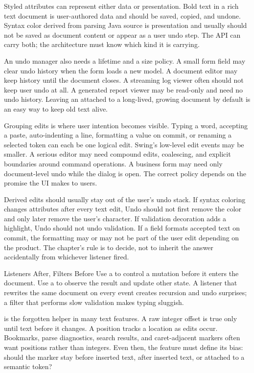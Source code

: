 Styled attributes can represent either data or presentation. Bold text in a rich text document is user-authored data and should be saved, copied, and undone. Syntax color derived from parsing Java source is presentation and usually should not be saved as document content or appear as a user undo step. The API can carry both; the architecture must know which kind it is carrying.

An undo manager also needs a lifetime and a size policy. A small form field may
clear undo history when the form loads a new model. A document editor may keep
history until the document closes. A streaming log viewer often should not keep
user undo at all. A generated report viewer may be read-only and need no undo
history. Leaving an  attached to a long-lived, growing
document by default is an easy way to keep old text alive.

Grouping edits is where user intention becomes visible. Typing a word,
accepting a paste, auto-indenting a line, formatting a value on commit, or
renaming a selected token can each be one logical edit. Swing's low-level edit
events may be smaller. A serious editor may need compound edits, coalescing,
and explicit boundaries around command operations. A business form may need
only document-level undo while the dialog is open. The correct policy depends
on the promise the UI makes to users.

Derived edits should usually stay out of the user's undo stack. If syntax
coloring changes attributes after every text edit, Undo should not first remove
the color and only later remove the user's character. If validation decoration
adds a highlight, Undo should not undo validation. If a field formats accepted
text on commit, the formatting may or may not be part of the user edit
depending on the product. The chapter's rule is to decide, not to inherit the
answer accidentally from whichever listener fired.

\begin{detailbox}{Listeners After, Filters Before}
Use a  to control a mutation before it enters the document. Use a  to observe the result and update other state. A listener that rewrites the same document on every event creates recursion and undo surprises; a filter that performs slow validation makes typing sluggish.
\end{detailbox}

 is the forgotten helper in many text features. A raw integer offset is true only until text before it changes. A position tracks a location as edits occur. Bookmarks, parse diagnostics, search results, and caret-adjacent markers often want positions rather than integers. Even then, the feature must define its bias: should the marker stay before inserted text, after inserted text, or attached to a semantic token?

